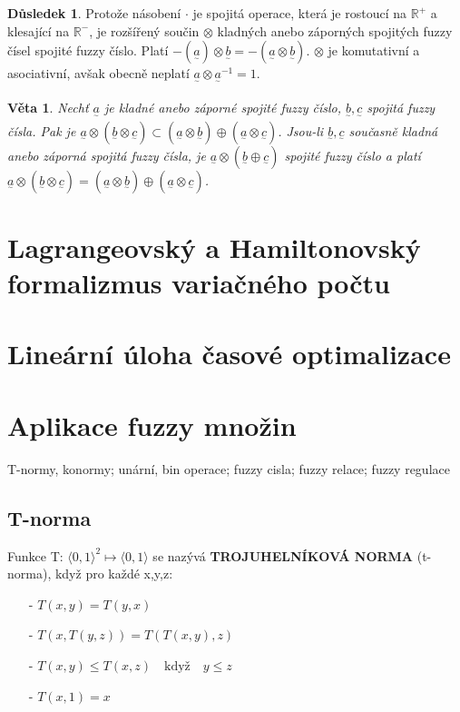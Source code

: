 \documentclass[a4]{report}
\newcommand{\fa}{\underset{^\sim}a}
\newcommand{\fb}{\underset{^\sim}b}
\newcommand{\fc}{\underset{^\sim}c}
\newtheorem{theorem}{Věta}
\theoremstyle{definition}
\newtheorem{dusledek}{Důsledek}[section]
\begin{document}
{\begin{dusledek}
Protože násobení $\cdot$ je spojitá operace, která je rostoucí na $\mathbb{R}^+$ a klesající na $\mathbb{R}^-$, je rozšířený součin $\otimes$ kladných anebo záporných spojitých fuzzy čísel spojité fuzzy číslo. Platí $-(\fa) \otimes \fb = -(\fa \otimes \fb)$. $\otimes$ je komutativní a asociativní, avšak obecně neplatí $\fa \otimes \fa^{-1} = 1$.
\end{dusledek}

\begin{theorem}
Nechť $\fa$ je kladné anebo záporné spojité fuzzy číslo, $\fb, \fc$ spojitá fuzzy čísla. Pak je $\fa \otimes (\fb \otimes \fc) \subset (\fa \otimes \fb) \oplus (\fa \otimes \fc)$. Jsou-li $\fb, \fc$ současně kladná anebo záporná spojitá fuzzy čísla, je $\fa \otimes (\fb \oplus \fc)$ spojité fuzzy číslo a platí $\fa \otimes (\fb \otimes \fc) = (\fa \otimes \fb) \oplus (\fa \otimes \fc)$.
\end{theorem}

\section{Lagrangeovský a Hamiltonovský formalizmus variačného počtu}

\section{Lineární úloha časové optimalizace}

\section{Aplikace fuzzy množin}
T-normy, konormy; unární, bin operace; fuzzy cisla; fuzzy relace; fuzzy regulace
\subsection{T-norma}
Funkce T: $\langle0,1\rangle^2\mapsto\langle0,1\rangle$ se nazývá \textbf{TROJUHELNÍKOVÁ NORMA} (t-norma), když pro každé x,y,z: 

\begin{itemize}
\item[-]{$T(x,y)=T(y,x)$}
\item[-]{$T(x,T(y,z))=T(T(x,y),z)$}
\item[-]{$T(x,y)\leq T(x,z)\quad \text{když} \quad y\leq z$}
\item[-]{$T(x,1)=x$}
\end{itemize}

}
\end{document}
